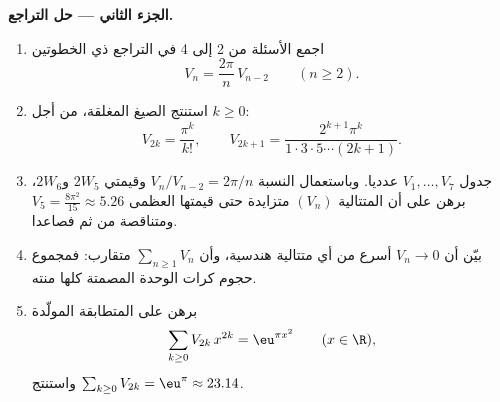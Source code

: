 \begin{problem}[{مسألة نهاية الأسبوع --- $V_n =
\pi^{n/2}/\Gamma(\frac n2 + 1)$، وغرابة الأبعاد
العليا}]
\medskip
\noindent\textbf{الجزء الثاني --- حل التراجع.}
\begin{enumerate}[resume]
  \item اجمع الأسئلة من 2 إلى 4 في التراجع ذي الخطوتين
        \[
        V_n = \frac{2\pi}{n}\,V_{n-2}
        \qquad (n \geq 2).
        \]
  \item استنتج الصيغ المغلقة، من أجل $k \geq 0$:
        \[
        V_{2k} = \frac{\pi^k}{k!},
        \qquad
        V_{2k+1} = \frac{2^{k+1}\pi^k}{1\cdot3\cdot5\cdots
        (2k+1)} .
        \]
  \item جدول $V_1, \dots, V_7$ عدديا. وباستعمال النسبة $V_n/V_{n-2} = 2\pi/n$ وقيمتي $2W_5$
        و$2W_6$، برهن على أن المتتالية $(V_n)$ متزايدة حتى قيمتها
        العظمى $V_5 = \frac{8\pi^2}{15} \approx
        5.26$ ومتناقصة من ثم فصاعدا.
  \item بيّن أن $V_n \to 0$ أسرع من أي متتالية هندسية، وأن $\sum_{n\geq1} V_n$
        متقارب: فمجموع حجوم كرات الوحدة المصمتة كلها منته.
  \item برهن على المتطابقة المولّدة
        \[
        \sum_{k\geq0} V_{2k}\,x^{2k} = \eu^{\pi x^2}
        \qquad (x \in \R),
        \]
        واستنتج $\sum_{k\geq0}V_{2k} = \eu^\pi \approx
        23.14$.
\end{enumerate}


\end{problem}
